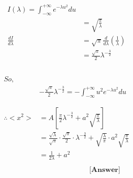 \documentclass{article}
\begin{document}
\pagebreak
\begin{homeworkProblem}
    \[
    \begin{split}
        \textbf{}
        \\
        I(\lambda) = \int_{-\infty}^{+\infty}  e^{-\lambda u^2} du
        \\
        &= \sqrt{\frac{\pi}{\lambda}}
        \\
        \frac{dI}{d\lambda} &= \sqrt{\pi} \frac{d}{d\lambda} (\frac{1}{\lambda})
        \\
        &= \frac{\sqrt{\pi}}{2} \lambda^{-\frac{3}{2}}\\
    \end{split}
    \]
    \\
    \[
    \begin{split}
        So,
        \\
        & - \frac{\sqrt{\pi}}{2} \lambda ^{-\frac{3}{2}} = - \int_{-\infty}^{+\infty} u^2 e^{-\lambda u^2} du
        \\ \\ \\
        \therefore < x^2 > &= A \left[\frac{\pi}{2} \lambda^{-\frac{3}{2}} + a^2 \sqrt{\frac{\pi}{\lambda}}\right]
        \\
        &= \frac{\sqrt{\lambda}}{\sqrt{\pi}} \cdot \frac{\sqrt{\pi}}{2}
        \cdot \lambda^{-\frac{3}{2}} + \sqrt{\frac{\lambda}{\pi}} \cdot a^2 \sqrt{\frac{\pi}{\lambda}}
        \\
        &= \frac{1}{2 \lambda} + a^2
        \\\\
        &\ \ \ \ \ \ \ \ \ \ \ \ \ \ \ \ \ \ \ \ \ \ \ \ \ \ \ \ \ \ \ \ \textbf{[Answer]}
    \end{split}
    \]
    
\end{homeworkProblem}

\pagebreak



                
\end{document}
